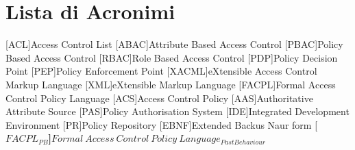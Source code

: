 \documentclass[twoside,openright,titlepage,fleqn,
headinclude,12pt,a4paper,BCOR5mm,footinclude]{scrbook}
\begin{document}
\section*{Lista di Acronimi}
\begin{acronym}[FACPL]
[ACL]{Access Control List}
[ABAC]{Attribute Based Access Control}
[PBAC]{Policy Based Access Control}
[RBAC]{Role Based Access Control}
[PDP]{Policy Decision Point}
[PEP]{Policy Enforcement Point}
[XACML]{eXtensible Access Control Markup Language}
[XML]{eXtensible Markup Language}
[FACPL]{Formal Access Control Policy Language}
[ACS]{Access Control Policy}
[AAS]{Authoritative Attribute Source}
[PAS]{Policy Authorisation System}
[IDE]{Integrated Development Environment}
[PR]{Policy Repository}
[EBNF]{Extended Backus Naur form}
[\bfseries{$FACPL_{PB}$}]{$Formal\ Access\ Control\  Policy\ Language_{Past Behaviour}$}
\end{acronym}



\end{document}
